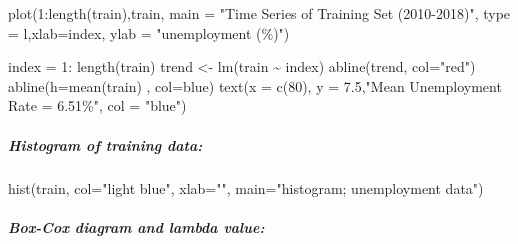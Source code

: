 \documentclass[
  letterpaper,
  DIV=11,
  numbers=noendperiod]{scrartcl}
\let\oldsubparagraph\subparagraph
\renewcommand{\subparagraph}[1]{\oldsubparagraph{#1}\mbox{}}
\newenvironment{Shaded}{\begin{snugshade}}{\end{snugshade}}
\newcommand{\AttributeTok}[1]{\textcolor[rgb]{0.40,0.45,0.13}{#1}}
\newcommand{\CommentTok}[1]{\textcolor[rgb]{0.37,0.37,0.37}{#1}}
\newcommand{\DecValTok}[1]{\textcolor[rgb]{0.68,0.00,0.00}{#1}}
\newcommand{\FloatTok}[1]{\textcolor[rgb]{0.68,0.00,0.00}{#1}}
\newcommand{\FunctionTok}[1]{\textcolor[rgb]{0.28,0.35,0.67}{#1}}
\newcommand{\NormalTok}[1]{\textcolor[rgb]{0.00,0.23,0.31}{#1}}
\newcommand{\OtherTok}[1]{\textcolor[rgb]{0.00,0.23,0.31}{#1}}
\newcommand{\SpecialCharTok}[1]{\textcolor[rgb]{0.37,0.37,0.37}{#1}}
\newcommand{\StringTok}[1]{\textcolor[rgb]{0.13,0.47,0.30}{#1}}
\begin{document}
\begin{Shaded}
\begin{Highlighting}[]
\FunctionTok{plot}\NormalTok{(}\DecValTok{1}\SpecialCharTok{:}\FunctionTok{length}\NormalTok{(train),train, }\AttributeTok{main =} \StringTok{"Time Series of Training Set}
\StringTok{     (2010{-}2018)"}\NormalTok{, }\AttributeTok{type =} \StringTok{\textquotesingle{}l\textquotesingle{}}\NormalTok{,}\AttributeTok{xlab=}\StringTok{\textquotesingle{}index\textquotesingle{}}\NormalTok{, }\AttributeTok{ylab =} \StringTok{"unemployment (\%)"}\NormalTok{)}

\NormalTok{index }\OtherTok{=} \DecValTok{1}\SpecialCharTok{:} \FunctionTok{length}\NormalTok{(train)}
\NormalTok{trend }\OtherTok{\textless{}{-}} \FunctionTok{lm}\NormalTok{(train }\SpecialCharTok{\textasciitilde{}}\NormalTok{ index)}
\FunctionTok{abline}\NormalTok{(trend, }\AttributeTok{col=}\StringTok{"red"}\NormalTok{)}
\FunctionTok{abline}\NormalTok{(}\AttributeTok{h=}\FunctionTok{mean}\NormalTok{(train) , }\AttributeTok{col=}\StringTok{\textquotesingle{}blue\textquotesingle{}}\NormalTok{)}
\FunctionTok{text}\NormalTok{(}\AttributeTok{x =} \FunctionTok{c}\NormalTok{(}\DecValTok{80}\NormalTok{), }\AttributeTok{y =} \FloatTok{7.5}\NormalTok{,}\StringTok{"Mean Unemployment}
\StringTok{     Rate = 6.51\%"}\NormalTok{, }\AttributeTok{col =} \StringTok{"blue"}\NormalTok{)}
\end{Highlighting}
\end{Shaded}

\hypertarget{histogram-of-training-data}{%
\subparagraph{Histogram of training
data:}\label{histogram-of-training-data}}

\begin{Shaded}
\begin{Highlighting}[]
\FunctionTok{hist}\NormalTok{(train, }\AttributeTok{col=}\StringTok{"light blue"}\NormalTok{, }\AttributeTok{xlab=}\StringTok{""}\NormalTok{, }\AttributeTok{main=}\StringTok{"histogram; unemployment data"}\NormalTok{)}
\end{Highlighting}
\end{Shaded}

\hypertarget{box-cox-diagram-and-lambda-value}{%
\subparagraph{Box-Cox diagram and lambda
value:}\label{box-cox-diagram-and-lambda-value}}

\begin{Shaded}
\end{Shaded}
\end{document}
